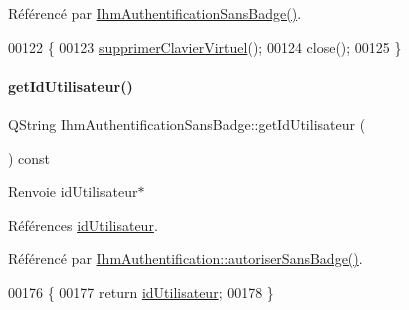 Référencé par \hyperlink{class_ihm_authentification_sans_badge_aace6d9eebcab9fee429fe9dbb6840f15}{Ihm\+Authentification\+Sans\+Badge()}.


\begin{DoxyCode}
00122 \{
00123     \hyperlink{class_ihm_authentification_sans_badge_ab90d91062763a53ac39df5a9fdc4da85}{supprimerClavierVirtuel}();
00124     close();
00125 \}
\end{DoxyCode}
\mbox{\label{class_ihm_authentification_sans_badge_acd5fea74d025db830e6e880e55d5c2f0}} 
\paragraph{\texorpdfstring{get\+Id\+Utilisateur()}{getIdUtilisateur()}}
{\footnotesize\ttfamily Q\+String Ihm\+Authentification\+Sans\+Badge\+::get\+Id\+Utilisateur (\begin{DoxyParamCaption}{ }\end{DoxyParamCaption}) const}

\begin{DoxyReturn}{Renvoie}
id\+Utilisateur$\ast$ 
\end{DoxyReturn}


Références \hyperlink{class_ihm_authentification_sans_badge_a2ff19fe279947b469dbc48b6ff2db187}{id\+Utilisateur}.



Référencé par \hyperlink{class_ihm_authentification_add8f8e7a0fbf70cef9399ba9f7db7b7e}{Ihm\+Authentification\+::autoriser\+Sans\+Badge()}.


\begin{DoxyCode}
00176 \{
00177     \textcolor{keywordflow}{return} \hyperlink{class_ihm_authentification_sans_badge_a2ff19fe279947b469dbc48b6ff2db187}{idUtilisateur};
00178 \}
\end{DoxyCode}
\mbox{\label{class_ihm_authentification_sans_badge_aa273ef3009c84c8f5f48e4d3591df8e7}} 

